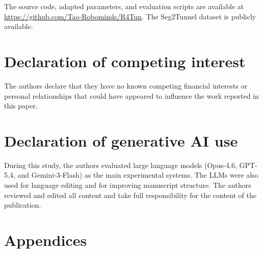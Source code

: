 \documentclass[a4paper,fleqn]{cas-dc}
\begin{document}
The source code, adapted parameters, and evaluation scripts are available at \url{https://github.com/Tao-Robominds/R4Tun}. The Seg2Tunnel dataset is publicly available.

\section*{Declaration of competing interest}

The authors declare that they have no known competing financial interests or personal relationships that could have appeared to influence the work reported in this paper.

\section*{Declaration of generative AI use}

During this study, the authors evaluated large language models (Opus-4.6, GPT-5.4, and Gemini-3-Flash) as the main experimental systems. The LLMs were also used for language editing and for improving manuscript structure. The authors reviewed and edited all content and take full responsibility for the content of the publication.








\clearpage
\section*{Appendices}


\end{document}
